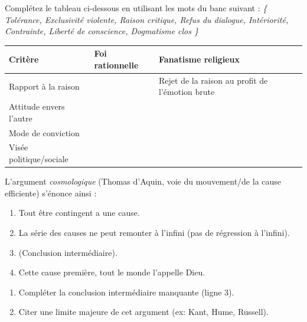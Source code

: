 \documentclass[11pt]{article}
\begin{document}
\begin{exercice}
Complétez le tableau ci-dessous en utilisant les mots du banc suivant :
\textit{\{ Tolérance, Exclusivité violente, Raison critique, Refus du dialogue, Intériorité, Contrainte, Liberté de conscience, Dogmatisme clos \}}

\begin{tabular}{|p{3.5cm}|p{5.5cm}|p{5.5cm}|}
\hline
\textbf{Critère} & \textbf{Foi rationnelle} & \textbf{Fanatisme religieux} \\ \hline
Rapport à la raison & \underline{\hspace{5cm}} & Rejet de la raison au profit de l'émotion brute \\ \hline
Attitude envers l'autre & \underline{\hspace{5cm}} & \underline{\hspace{5cm}} \\ \hline
Mode de conviction & \underline{\hspace{5cm}} & \underline{\hspace{5cm}} \\ \hline
Visée politique/sociale & \underline{\hspace{5cm}} & \underline{\hspace{5cm}} \\ \hline
\end{tabular}
\end{exercice}

\begin{exercice}
L'argument \textit{cosmologique} (Thomas d'Aquin, voie du mouvement/de la cause efficiente) s'énonce ainsi :
\begin{enumerate}
    \item Tout être contingent a une cause.
    \item La série des causes ne peut remonter à l'infini (pas de régression à l'infini).
    \item \underline{\hspace{6cm}} (Conclusion intermédiaire).
    \item Cette cause première, tout le monde l'appelle Dieu.
\end{enumerate}
\begin{enumerate}
    \item Compléter la conclusion intermédiaire manquante (ligne 3).
    \item Citer une limite majeure de cet argument (ex: Kant, Hume, Russell).
\end{enumerate}
\end{exercice}
\end{document}
